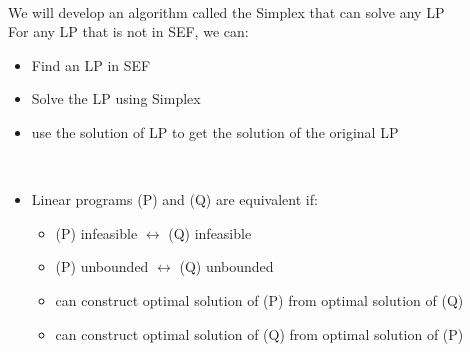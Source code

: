 \documentclass[letterpaper, 12pt]{article}
\newcommand{\red}[1]{{\color{red}{#1}}}
\begin{document}
    \red{\textbf{Motivation:}}\\
    We will develop an algorithm called the Simplex that can solve any LP \red{if it is in SEF}\\
    For any LP that is not in SEF, we can:\\
    \begin{itemize}
        \item Find an \red{"equivalent"} LP in SEF
        \item Solve the \red{"equivalent"} LP using Simplex
        \item use the solution of \red{"equivalent"} LP to get the solution of the original LP
    \end{itemize}
    \bigskip
    \red{"Equivalent LPs"}\\
    \begin{itemize}
        \item Linear programs (P) and (Q) are equivalent if:
        \begin{itemize}
            \item (P) infeasible $\longleftrightarrow$ (Q) infeasible
            \item (P) unbounded $\longleftrightarrow$ (Q) unbounded
            \item can construct optimal solution of (P) from optimal solution of (Q)
            \item can construct optimal solution of (Q) from optimal solution of (P)
        \end{itemize}
    \end{itemize}
\end{document}
